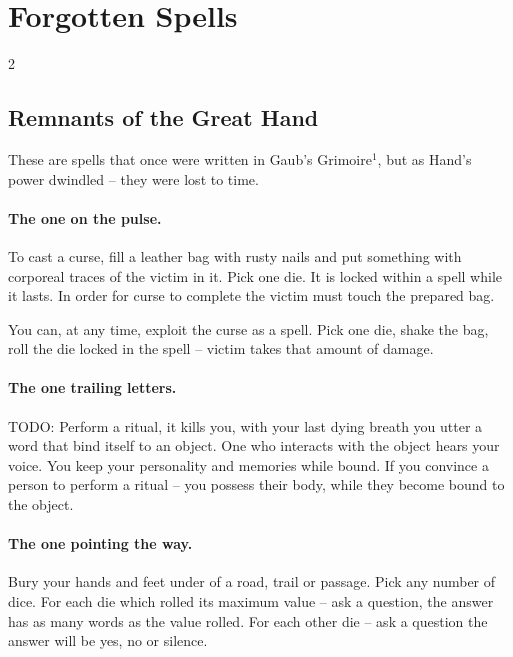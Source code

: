 \section*{\centering \fontsize{35}{45}\selectfont Forgotten Spells}
\vspace*{0.4 cm}

\label{sec:forgotten}

\begin{multicols*}{2}

\subsection*{Remnants of the Great Hand}

These are spells that once were written in Gaub's Grimoire$^1$, but as Hand's power dwindled -- they were lost to time.

\paragraph{The one on the pulse.} To cast a curse, fill a leather bag with rusty nails and put something with corporeal traces of the victim in it.
Pick one die. It is locked within a spell while it lasts. 
In order for curse to complete the victim must touch the prepared bag.

You can, at any time, exploit the curse as a spell.
Pick one die, shake the bag, roll the die locked in the spell -- victim takes that amount of damage. 

\paragraph{The one trailing letters.} TODO: Perform a ritual, it kills you, with your last dying breath you utter a word that bind itself to an object.
One who interacts with the object hears your voice. You keep your personality and memories while bound. 
If you convince a person to perform a ritual -- you possess their body, while they become bound to the object.

\paragraph{The one pointing the way.} Bury your hands and feet under of a road, trail or passage. 
Pick any number of dice. For each die which rolled its maximum value -- ask a question, the answer has as many words as the value rolled.
For each other die -- ask a question the answer will be yes, no or silence.


\end{multicols*}
